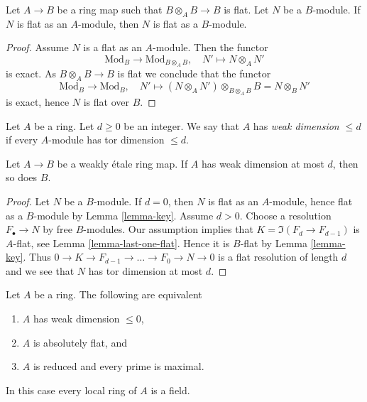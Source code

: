 \begin{lemma}
\label{lemma-key}
Let $A \to B$ be a ring map such that $B \otimes_A B \to B$ is flat.
Let $N$ be a $B$-module. If $N$ is flat as an $A$-module, then
$N$ is flat as a $B$-module.
\end{lemma}

\begin{proof}
Assume $N$ is a flat as an $A$-module.
Then the functor
$$
\text{Mod}_B \longrightarrow \text{Mod}_{B \otimes_A B},\quad
N' \mapsto N \otimes_A N'
$$
is exact. As $B \otimes_A B \to B$ is flat we conclude that the functor
$$
\text{Mod}_B \longrightarrow \text{Mod}_B,\quad
N' \mapsto (N \otimes_A N') \otimes_{B \otimes_A B} B = N \otimes_B N'
$$
is exact, hence $N$ is flat over $B$.
\end{proof}

\begin{definition}
\label{definition-weak-dimension}
Let $A$ be a ring. Let $d \geq 0$ be an integer.
We say that $A$ has {\it weak dimension $\leq d$}
if every $A$-module has tor dimension $\leq d$.
\end{definition}

\begin{lemma}
\label{lemma-weak-dimension-goes-up}
Let $A \to B$ be a weakly \'etale ring map.
If $A$ has weak dimension at most $d$, then so does $B$.
\end{lemma}

\begin{proof}
Let $N$ be a $B$-module. If $d = 0$, then $N$ is flat as an $A$-module,
hence flat as a $B$-module by Lemma \ref{lemma-key}.
Assume $d > 0$. Choose a resolution $F_\bullet \to N$
by free $B$-modules. Our assumption implies that
$K = \Im(F_d \to F_{d - 1})$ is $A$-flat, see
Lemma \ref{lemma-last-one-flat}. Hence it is $B$-flat
by Lemma \ref{lemma-key}. Thus
$0 \to K \to F_{d - 1} \to \ldots \to F_0 \to N \to 0$
is a flat resolution of length $d$ and we see that $N$ has
tor dimension at most $d$.
\end{proof}

\begin{lemma}
\label{lemma-absolutely-flat}
Let $A$ be a ring. The following are equivalent
\begin{enumerate}
\item $A$ has weak dimension $\leq 0$,
\item $A$ is absolutely flat, and
\item $A$ is reduced and every prime is maximal.
\end{enumerate}
In this case every local ring of $A$ is a field.
\end{lemma}

